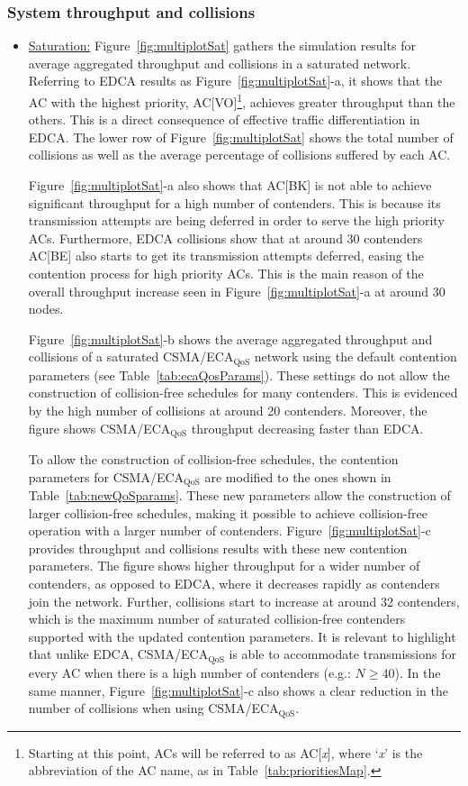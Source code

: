 \subsubsection{System throughput and collisions}
\begin{itemize}
\item\underline{Saturation:} Figure~\ref{fig:multiplotSat} gathers the simulation results for average aggregated throughput and collisions in a saturated network. Referring to EDCA results as Figure~\ref{fig:multiplotSat}-a,  it shows that the AC with the highest priority, AC[VO]\footnote{Starting at this point, ACs will be referred to as AC[\emph{x}], where `\emph{x}' is the abbreviation of the AC name, as in Table~\ref{tab:prioritiesMap}.}, achieves greater throughput than the others. This is a direct consequence of effective traffic differentiation in EDCA. The lower row of Figure~\ref{fig:multiplotSat} shows the total number of collisions as well as the average percentage of collisions suffered by each AC. 

Figure~\ref{fig:multiplotSat}-a also shows that AC[BK] is not able to achieve significant throughput for a high number of contenders. This is because its transmission attempts are being deferred in order to serve the high priority ACs. Furthermore, EDCA collisions show that at around 30 contenders AC[BE] also starts to get its transmission attempts deferred, easing the contention process for high priority ACs. This is the main reason of the overall throughput increase seen in Figure~\ref{fig:multiplotSat}-a at around 30 nodes.

Figure~\ref{fig:multiplotSat}-b shows the average aggregated throughput and collisions of a saturated CSMA/ECA$_{\text{QoS}}$ network using the default contention parameters (see Table~\ref{tab:ecaQosParams}). These settings do not allow the construction of collision-free schedules for many contenders. This is evidenced by the high number of collisions at around 20 contenders. Moreover, the figure shows CSMA/ECA$_{\text{QoS}}$ throughput decreasing faster than EDCA.

To allow the construction of collision-free schedules, the contention parameters for CSMA/ECA$_{\text{QoS}}$ are modified to the ones shown in Table~\ref{tab:newQoSparams}. These new parameters allow the construction of larger collision-free schedules, making it possible to achieve collision-free operation with a larger number of contenders. Figure~\ref{fig:multiplotSat}-c provides throughput and collisions results with these new contention parameters. The figure shows higher throughput for a wider number of contenders, as opposed to EDCA, where it decreases rapidly as contenders join the network. Further, collisions start to increase at around 32 contenders, which is the maximum number of saturated collision-free contenders supported with the updated contention parameters. It is relevant to highlight that unlike EDCA, CSMA/ECA$_{\text{QoS}}$ is able to accommodate transmissions for every AC when there is a high number of contenders (e.g.: $N\geq 40$). In the same manner, Figure~\ref{fig:multiplotSat}-c also shows a clear reduction in the number of collisions when using CSMA/ECA$_{\text{QoS}}$.


\end{itemize}
